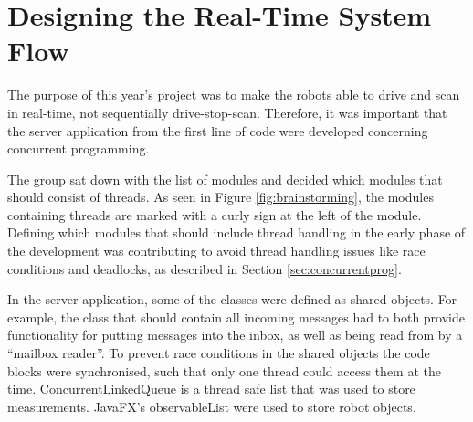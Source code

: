\section{Designing the Real-Time System Flow}
The purpose of this year's project was to make the robots able to drive and scan in real-time, not sequentially drive-stop-scan. Therefore, it was important that the server application from the first line of code were developed concerning concurrent programming.

The group sat down with the list of modules and decided which modules that should consist of threads. As seen in Figure \ref{fig:brainstorming}, the modules containing threads are marked with a curly sign at the left of the module. Defining which modules that should include thread handling in the early phase of the development was contributing to avoid thread handling issues like race conditions and deadlocks, as described in Section \ref{sec:concurrentprog}.

In the server application, some of the classes were defined as shared objects. For example, the class that should contain all incoming messages had to both provide functionality for putting messages into the inbox, as well as being read from by a ``mailbox reader''. To prevent race conditions in the shared objects the code blocks were synchronised, such that only one thread could access them at the time. ConcurrentLinkedQueue is a thread safe list that was used to store measurements. JavaFX's observableList were used to store robot objects.